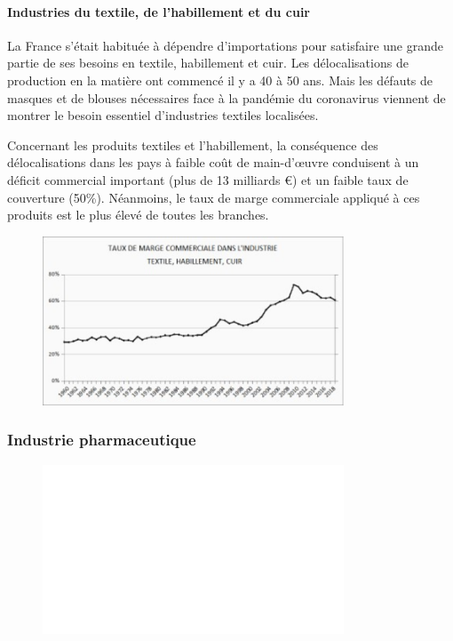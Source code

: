 \documentclass[a4paper]{article}
\begin{document}
\paragraph{Industries du textile, de l’habillement et du cuir}
La France s’était habituée à dépendre d’importations pour satisfaire une grande partie de ses besoins en textile, habillement et cuir.  Les délocalisations de production en la matière ont commencé il y a 40 à 50 ans. Mais les défauts de masques et de blouses nécessaires face à la pandémie du coronavirus viennent de montrer le besoin essentiel d’industries textiles localisées. 

Concernant les produits textiles et l’habillement, la conséquence des délocalisations dans les pays à faible coût de main-d’œuvre conduisent à un déficit commercial important (plus de 13 milliards €) et un faible taux de couverture (50\%).  Néanmoins, le taux de marge commerciale appliqué à ces produits est le plus élevé de toutes les branches. 

\begin{figure}[H]
    \centering
    \includegraphics*[width=0.8\textwidth]{images/marge-textile}
    \label{fig:marge-textile}
\end{figure}

\subsubsection{Industrie pharmaceutique}

\begin{figure}[H]
    \centering
    \includegraphics*[width=0.8\textwidth]{images/solde5}
    \label{fig:solde5}
\end{figure}
\end{document}
